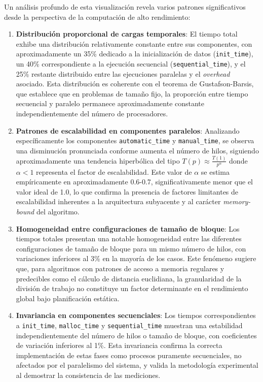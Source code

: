         Un análisis profundo de esta visualización revela varios patrones significativos desde la perspectiva de la computación de alto rendimiento:
    
        \begin{enumerate}
        
            \item \textbf{Distribución proporcional de cargas temporales}: El tiempo total exhibe una distribución relativamente constante entre sus componentes, con aproximadamente un 35\% dedicado a la inicialización de datos (\texttt{init\_time}), un 40\% correspondiente a la ejecución secuencial (\texttt{sequential\_time}), y el 25\% restante distribuido entre las ejecuciones paralelas y el \textit{overhead} asociado. Esta distribución es coherente con el teorema de Gustafson-Barsis, que establece que en problemas de tamaño fijo, la proporción entre tiempo secuencial y paralelo permanece aproximadamente constante independientemente del número de procesadores.
            
            \item \textbf{Patrones de escalabilidad en componentes paralelos}: Analizando específicamente los componentes \texttt{automatic\_time} y \texttt{manual\_time}, se observa una disminución pronunciada conforme aumenta el número de hilos, siguiendo aproximadamente una tendencia hiperbólica del tipo $T(p) \approx \frac{T(1)}{p^{\alpha}}$ donde $\alpha < 1$ representa el factor de escalabilidad. Este valor de $\alpha$ se estima empíricamente en aproximadamente 0.6-0.7, significativamente menor que el valor ideal de 1.0, lo que confirma la presencia de factores limitantes de escalabilidad inherentes a la arquitectura subyacente y al carácter \textit{memory-bound} del algoritmo.
            
            \item \textbf{Homogeneidad entre configuraciones de tamaño de bloque}: Los tiempos totales presentan una notable homogeneidad entre las diferentes configuraciones de tamaño de bloque para un mismo número de hilos, con variaciones inferiores al 3\% en la mayoría de los casos. Este fenómeno sugiere que, para algoritmos con patrones de acceso a memoria regulares y predecibles como el cálculo de distancia euclidiana, la granularidad de la división de trabajo no constituye un factor determinante en el rendimiento global bajo planificación estática.
            
            \item \textbf{Invariancia en componentes secuenciales}: Los tiempos correspondientes a \texttt{init\_time}, \texttt{malloc\_time} y \texttt{sequential\_time} muestran una estabilidad independientemente del número de hilos o tamaño de bloque, con coeficientes de variación inferiores al 1\%. Esta invariancia confirma la correcta implementación de estas fases como procesos puramente secuenciales, no afectados por el paralelismo del sistema, y valida la metodología experimental al demostrar la consistencia de las mediciones.
            

\end{enumerate}
